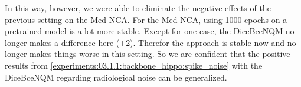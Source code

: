 In this way, however, we were able to eliminate the negative effects of the previous setting on the Med-NCA. For the Med-NCA, using 1000 epochs on a pretrained model is a lot more stable. Except for one case, the DiceBceNQM no longer makes a difference here ($\pm$2). Therefor the approach is stable now and no longer makes things worse in this setting.
So we are confident that the positive results from \autoref{experiments:03.1.1:backbone_hippo:spike_noise} with the DiceBceNQM regarding radiological noise can be generalized.
\iffalse
--- Spike 1k
mean: 0.0076
mean on absoulte values: 0.0295
sum: 0.272
sum on absoulte values: 1.062
range: (-0.069, +0.136)

--- Noise 1k
mean: 0.0002
mean on absoulte values: 0.0235
sum: 0.007
sum on absoulte values: 0.845
range: (-0.052, 0.081)

--- Spike 3k
mean: 0.0012
mean on absoulte values: 0.0076
sum: 0.042
sum on absoulte values: 0.272
range: (-0.023, 0.053)
\fi


%